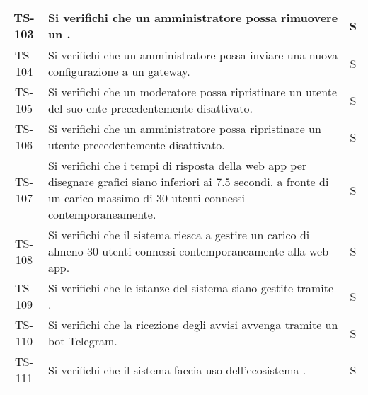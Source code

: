 \begin{center}
\begin{longtable}{|c|p{10cm}|c|}
			 \hline
			 TS-103 & Si verifichi che un amministratore possa rimuovere un \glock{gateway}. & S \\
			 \hline
			 TS-104 & Si verifichi che un amministratore possa inviare una nuova configurazione a un gateway. & S \\
			 \hline
			 TS-105 & Si verifichi che un moderatore possa ripristinare un utente del suo ente precedentemente disattivato. & S \\
			 \hline
			 TS-106 & Si verifichi che un amministratore possa ripristinare un utente precedentemente disattivato. & S \\
			 \hline
			 TS-107 & Si verifichi che i tempi di risposta della web app per disegnare grafici siano inferiori ai 7.5 secondi, a fronte di un carico massimo di 30 utenti connessi contemporaneamente. & S \\
			 \hline
			 TS-108 & Si verifichi che il sistema riesca a gestire un carico di almeno 30 utenti connessi contemporaneamente alla web app. & S \\
			 \hline
			 TS-109 & Si verifichi che le istanze del sistema siano gestite tramite \glock{Docker}. & S \\
			 \hline
			 TS-110 & Si verifichi che la ricezione degli avvisi avvenga tramite un bot Telegram. & S \\
			 \hline
			 TS-111 & Si verifichi che il sistema faccia uso dell'ecosistema \glock{Kafka}. & S \\

\end{longtable}
\end{center}

